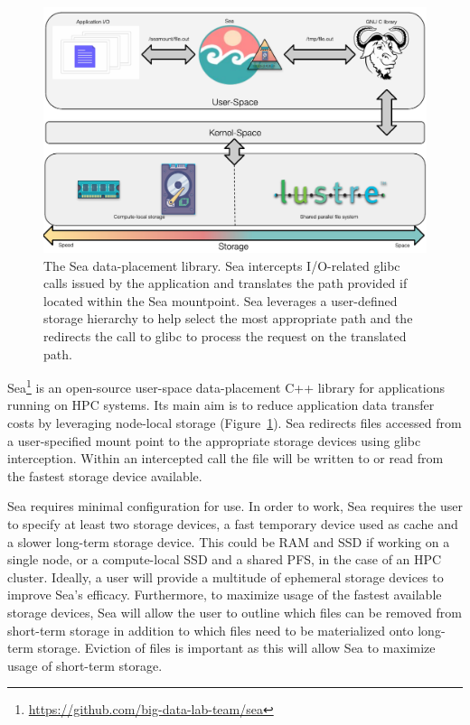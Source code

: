 \documentclass[10pt,journal,compsoc]{IEEEtran}
\begin{document}
\begin{figure}

    \centering
    \includegraphics[width=\columnwidth]{figures/seacomp-diagram.pdf}%
\caption{The Sea data-placement library. Sea intercepts I/O-related glibc calls
issued by the application and translates the path provided if located within the
Sea mountpoint. Sea leverages a user-defined storage hierarchy to help select
the most appropriate path and the redirects the call to glibc to process the
request on the translated path. }
\label{fig:sea-comp:diagram}
\end{figure}

Sea\footnote{\url{https://github.com/big-data-lab-team/sea}} is an open-source
user-space data-placement C++ library for applications running on HPC systems.
Its main aim is to reduce application data transfer costs by leveraging
node-local storage (Figure~\ref{fig:sea-comp:diagram}). Sea redirects files
accessed from a user-specified mount point to the appropriate storage devices
using glibc interception. Within an intercepted call the file will be written to
or read from the fastest storage device available. 


Sea requires minimal configuration for use. In order to work, Sea requires the
user to specify at least two storage devices, a fast temporary device used as cache
and a slower long-term storage device. This could be RAM and SSD if working on a
single node, or a compute-local SSD and a shared PFS, in the
case of an HPC cluster. Ideally, a user will provide a multitude of ephemeral
storage devices to improve Sea's efficacy. Furthermore, to maximize usage of the
fastest available storage devices, Sea will allow the user to outline which
files can be removed from short-term storage in addition to which files need to
be materialized onto long-term storage. Eviction of files is important as this
will allow Sea to maximize usage of short-term storage.
\end{document}
